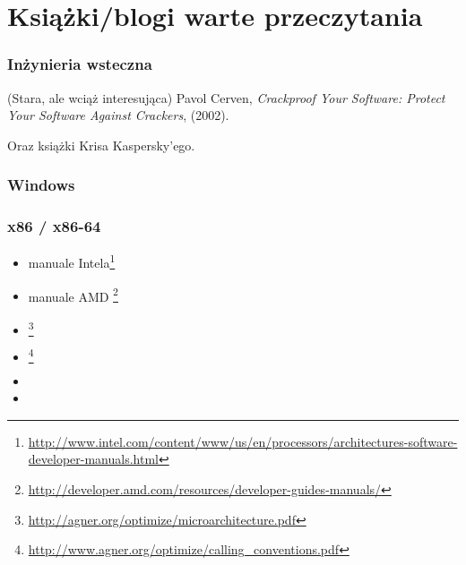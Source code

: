 \chapter{Książki/blogi warte przeczytania}


\subsection{Inżynieria wsteczna}



(Stara, ale wciąż interesująca) Pavol Cerven, \emph{Crackproof Your Software: Protect Your Software Against Crackers}, (2002).

Oraz książki Krisa Kaspersky'ego.

\subsection{Windows}



\subsection{\CCpp}



\subsection{x86 / x86-64}

\label{x86_manuals}
\begin{itemize}
\item manuale Intela\footnote{\AlsoAvailableAs \url{http://www.intel.com/content/www/us/en/processors/architectures-software-developer-manuals.html}}

\item manuale AMD \footnote{\AlsoAvailableAs \url{http://developer.amd.com/resources/developer-guides-manuals/}}

\item \AgnerFog{}\footnote{\AlsoAvailableAs \url{http://agner.org/optimize/microarchitecture.pdf}}

\item \AgnerFogCC{}\footnote{\AlsoAvailableAs \url{http://www.agner.org/optimize/calling_conventions.pdf}}

\item \IntelOptimization

\item \AMDOptimization
\end{itemize}

